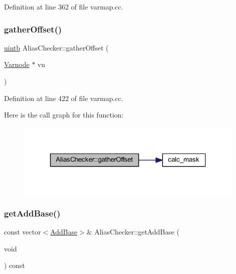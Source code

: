 Definition at line 362 of file varmap.\+cc.

\mbox{\label{class_alias_checker_af74df8f4fb5c4c3678180456bcc42b81}} 
\subsubsection{\texorpdfstring{gatherOffset()}{gatherOffset()}}
{\footnotesize\ttfamily \mbox{\hyperlink{types_8h_a2db313c5d32a12b01d26ac9b3bca178f}{uintb}} Alias\+Checker\+::gather\+Offset (\begin{DoxyParamCaption}\item[{\mbox{\hyperlink{class_varnode}{Varnode}} $\ast$}]{vn }\end{DoxyParamCaption})\hspace{0.3cm}{\ttfamily [static]}}



Definition at line 422 of file varmap.\+cc.

Here is the call graph for this function\+:
\nopagebreak
\begin{figure}[H]
\begin{center}
\leavevmode
\includegraphics[width=313pt]{class_alias_checker_af74df8f4fb5c4c3678180456bcc42b81_cgraph}
\end{center}
\end{figure}
\mbox{\label{class_alias_checker_af5696485bdbe41dd637ccb8987fa5303}} 
\subsubsection{\texorpdfstring{getAddBase()}{getAddBase()}}
{\footnotesize\ttfamily const vector$<$\mbox{\hyperlink{struct_alias_checker_1_1_add_base}{Add\+Base}}$>$\& Alias\+Checker\+::get\+Add\+Base (\begin{DoxyParamCaption}\item[{void}]{ }\end{DoxyParamCaption}) const\hspace{0.3cm}{\ttfamily [inline]}}



